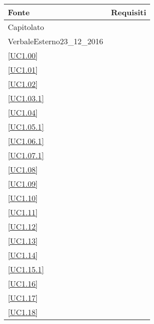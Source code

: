 \begin{longtable}{|P{6cm}|P{6cm}|}
	\hline \textbf{Fonte} & \textbf{Requisiti}\\
	\hline Capitolato &  \linebreak {} \linebreak {} \linebreak {} \linebreak {} \linebreak {} \linebreak {} \linebreak {} \linebreak {}\\
	\hline VerbaleEsterno23\_12\_2016 &  \linebreak {} \\
	\hline \ref{UC1.00} &  \\
	\hline \ref{UC1.01} &  \\
	\hline \ref{UC1.02} &  \\
	\hline \ref{UC1.03.1} &  \\
	\hline \ref{UC1.04} &  \\
	\hline \ref{UC1.05.1} &  \\
	\hline \ref{UC1.06.1} &  \\
	\hline \ref{UC1.07.1} &  \\
	\hline \ref{UC1.08} &  \\
	\hline \ref{UC1.09} &  \\
	\hline \ref{UC1.10} &  \\
	\hline \ref{UC1.11} &  \\	
	\hline \ref{UC1.12} &  \\
	\hline \ref{UC1.13} &  \\	
	\hline \ref{UC1.14} &  \\
	\hline \ref{UC1.15.1} &  \\
	\hline \ref{UC1.16} &  \\
	\hline \ref{UC1.17} &  \\
	\hline \ref{UC1.18} &  \\

\end{longtable}
